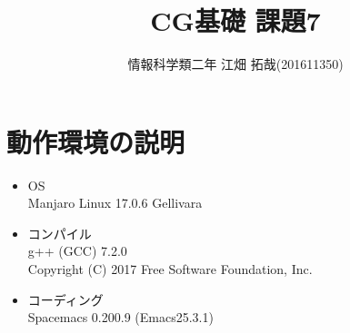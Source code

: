 \documentclass{scrartcl}
\author{情報科学類二年 江畑 拓哉(201611350)}
\date{}
\title{CG基礎 課題7}
\begin{document}
\maketitle

\section{動作環境の説明}
\label{sec:org100cc06}
\begin{itemize}
\item OS\\
Manjaro Linux 17.0.6 Gellivara\\
\item コンパイル\\
g++ (GCC) 7.2.0\\
Copyright (C) 2017 Free Software Foundation, Inc.\\
\item コーディング\\
Spacemacs 0.200.9 (Emacs25.3.1)\\
\end{itemize}
\end{document}
